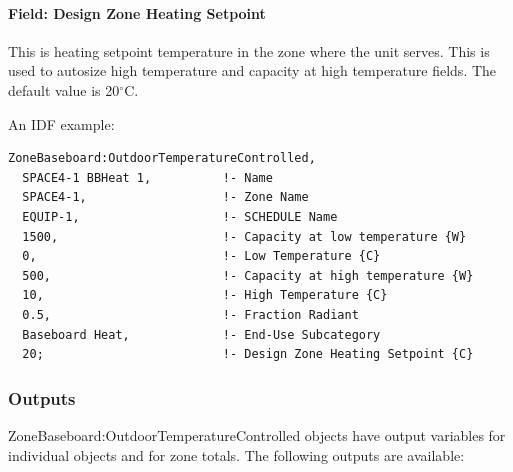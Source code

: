 \paragraph{Field: Design Zone Heating Setpoint}\label{field-design-zone-heating-setpoint}

This is heating setpoint temperature in the zone where the unit serves. This is used to autosize high temperature and capacity at high temperature fields. The default value is 20$^\circ$C.

An IDF example:

\begin{lstlisting}
ZoneBaseboard:OutdoorTemperatureControlled,
  SPACE4-1 BBHeat 1,          !- Name
  SPACE4-1,                   !- Zone Name
  EQUIP-1,                    !- SCHEDULE Name
  1500,                       !- Capacity at low temperature {W}
  0,                          !- Low Temperature {C}
  500,                        !- Capacity at high temperature {W}
  10,                         !- High Temperature {C}
  0.5,                        !- Fraction Radiant
  Baseboard Heat,             !- End-Use Subcategory
  20;                         !- Design Zone Heating Setpoint {C}
\end{lstlisting}

\subsubsection{Outputs}\label{outputs-14-002}

ZoneBaseboard:OutdoorTemperatureControlled objects have output variables for individual objects and for zone totals. The following outputs are available:

